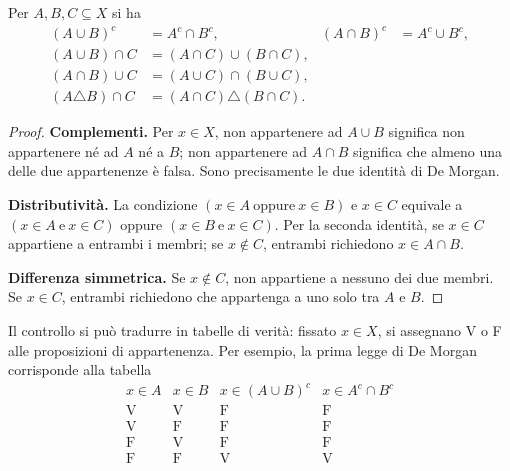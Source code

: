 \begin{proposizione}
Per $A,B,C\subseteq X$ si ha
\[
\begin{aligned}
(A\cup B)^c&=A^c\cap B^c,&(A\cap B)^c&=A^c\cup B^c,\\
(A\cup B)\cap C&=(A\cap C)\cup(B\cap C),\\
(A\cap B)\cup C&=(A\cup C)\cap(B\cup C),\\
(A\triangle B)\cap C&=(A\cap C)\triangle(B\cap C).
\end{aligned}
\]
\end{proposizione}
\begin{proof}
\textbf{Complementi.} Per $x\in X$, non appartenere ad $A\cup B$ significa non appartenere né ad $A$ né a $B$; non appartenere ad $A\cap B$ significa che almeno una delle due appartenenze è falsa. Sono precisamente le due identità di De Morgan.

\textbf{Distributività.} La condizione $(x\in A\ \text{oppure}\ x\in B)$ e $x\in C$ equivale a $(x\in A\ \text{e}\ x\in C)$ oppure $(x\in B\ \text{e}\ x\in C)$. Per la seconda identità, se $x\in C$ appartiene a entrambi i membri; se $x\notin C$, entrambi richiedono $x\in A\cap B$.

\textbf{Differenza simmetrica.} Se $x\notin C$, non appartiene a nessuno dei due membri. Se $x\in C$, entrambi richiedono che appartenga a uno solo tra $A$ e $B$.
\end{proof}

Il controllo si può tradurre in tabelle di verità: fissato $x\in X$, si assegnano V o F alle proposizioni di appartenenza. Per esempio, la prima legge di De Morgan corrisponde alla tabella
\[
\begin{array}{cc|c|c}
x\in A&x\in B&x\in(A\cup B)^c&x\in A^c\cap B^c\\\hline
\mathrm V&\mathrm V&\mathrm F&\mathrm F\\
\mathrm V&\mathrm F&\mathrm F&\mathrm F\\
\mathrm F&\mathrm V&\mathrm F&\mathrm F\\
\mathrm F&\mathrm F&\mathrm V&\mathrm V
\end{array}
\]

